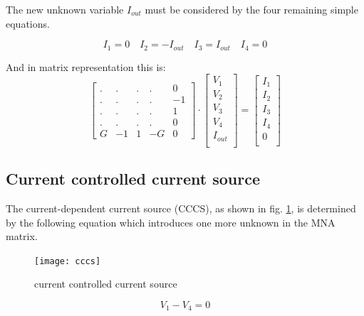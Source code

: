 The new unknown variable $I_{out}$ must be considered by the four
remaining simple equations.

\begin{equation}
I_{1} = 0 \quad I_{2} = -I_{out} \quad I_{3} = I_{out} \quad I_{4} = 0
\end{equation}

And in matrix representation this is:
\begin{equation}
\begin{bmatrix}
.&.&.&.& 0\\
.&.&.&.& -1\\
.&.&.&.& 1\\
.&.&.&.& 0\\
G & -1 & 1 & -G & 0
\end{bmatrix}
\cdot
\begin{bmatrix}
V_{1}\\
V_{2}\\
V_{3}\\
V_{4}\\
I_{out}\\
\end{bmatrix}
=
\begin{bmatrix}
I_{1}\\
I_{2}\\
I_{3}\\
I_{4}\\
0\\
\end{bmatrix}
\end{equation}

\subsection{Current controlled current source}
\label{sec:cccs}

The current-dependent current source (CCCS), as shown in fig.
\ref{fig:cccs}, is determined by the following equation which
introduces one more unknown in the MNA matrix.

\begin{figure}[ht]
\begin{center}
\texttt{[image: cccs]}
\end{center}
\caption{current controlled current source}
\label{fig:cccs}
\end{figure}
\FloatBarrier

\begin{equation}
V_{1} - V_{4} = 0
\label{eq:cccs}
\end{equation}

